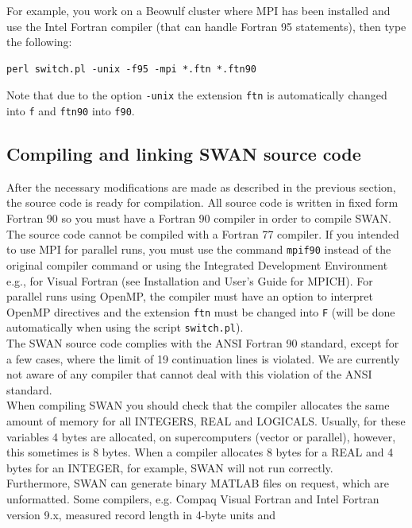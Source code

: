 \documentclass[12pt]{book}
\begin{document}
\noindent
For example, you work on a Beowulf cluster where MPI has been installed and use the Intel Fortran
compiler (that can handle Fortran 95 statements), then type the following:
\begin{verbatim}
perl switch.pl -unix -f95 -mpi *.ftn *.ftn90
\end{verbatim}
Note that due to the option {\tt -unix} the extension {\tt ftn} is automatically changed into {\tt f}
and {\tt ftn90} into {\tt f90}.

\subsection{Compiling and linking SWAN source code}

After the necessary modifications are made as described in the previous section, the source code is
ready for compilation. All source code is written in fixed form Fortran 90 so you must have a
Fortran 90 compiler in order to compile SWAN. The source code cannot be compiled with a Fortran 77
compiler. If you intended to use MPI for parallel runs, you must use the command {\tt mpif90} instead
of the original compiler command or using the Integrated Development Environment e.g., for Visual
Fortran (see Installation and User's Guide for MPICH). For parallel runs using OpenMP, the compiler
must have an option to interpret OpenMP directives and the extension {\tt ftn} must be changed into
{\tt F} (will be done automatically when using the script {\tt switch.pl}).
\\[2ex]
\noindent
The SWAN source code complies with the ANSI Fortran 90 standard, except for a few cases, where
the limit of 19 continuation lines is violated. We are currently not aware of any compiler that cannot
deal with this violation of the ANSI standard.
\\[2ex]
\noindent
When compiling SWAN you should check that the compiler allocates the same amount of memory
for all {\scriptsize INTEGERS}, {\scriptsize REAL} and {\scriptsize LOGICALS}. Usually, for these
variables 4 bytes are allocated, on supercomputers (vector or parallel), however, this sometimes
is 8 bytes. When a compiler allocates 8 bytes for a {\scriptsize REAL} and 4 bytes for an
{\scriptsize INTEGER}, for example, SWAN will not run correctly.
\\[2ex]
\noindent
Furthermore, SWAN can generate binary MATLAB files on request, which are unformatted. Some compilers,
e.g. Compaq Visual Fortran and Intel Fortran version 9.x, measured record length in 4-byte units and
\end{document}
